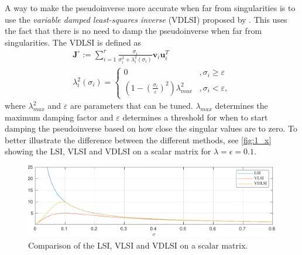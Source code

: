 A way to make the pseudoinverse more accurate when far from singularities is to
use the \emph{variable damped least-squares inverse} (VDLSI) proposed by \cite{chiaverini1997}.
This uses the fact that there is no need to damp the pseudoinverse when far from singularities.
The VDLSI is defined as
\begin{subequations}
\begin{align}
    \bm{J}^{\circ} := \sum_{i=1}^r \frac{\sigma_i}{\sigma_i^2 + \lambda_i^2(\sigma_i)} \bm{v}_i \bm{u}_i^T \\
    \lambda_i^2(\sigma_i) = \begin{cases}
        0 & ,\sigma_i \geq \varepsilon \\
        \left(1-\left(\frac{\sigma_i}{\varepsilon}\right)^2\right)\lambda_{max}^2 & ,\sigma_i < \varepsilon,
    \end{cases}
\end{align}
\end{subequations}
where $\lambda_{max}^2$ and $\varepsilon$ are parameters that can be tuned. $\lambda_{max}$
determines the maximum damping factor and $\varepsilon$ determines a threshold for when
to start damping the pseudoinverse based on how close the singular values are to zero.
To better illustrate the difference between the different methods, see \autoref{fig:1_x}
showing the LSI, VLSI and VDLSI on a scalar matrix for $\lambda=\epsilon=0.1$.

\begin{figure}[h]
    \centering
    \includegraphics[width=\textwidth]{assets/singval.pdf}
    \caption{Comparison of the LSI, VLSI and VDLSI on a scalar matrix.}
    \label{fig:1_x}
\end{figure}



